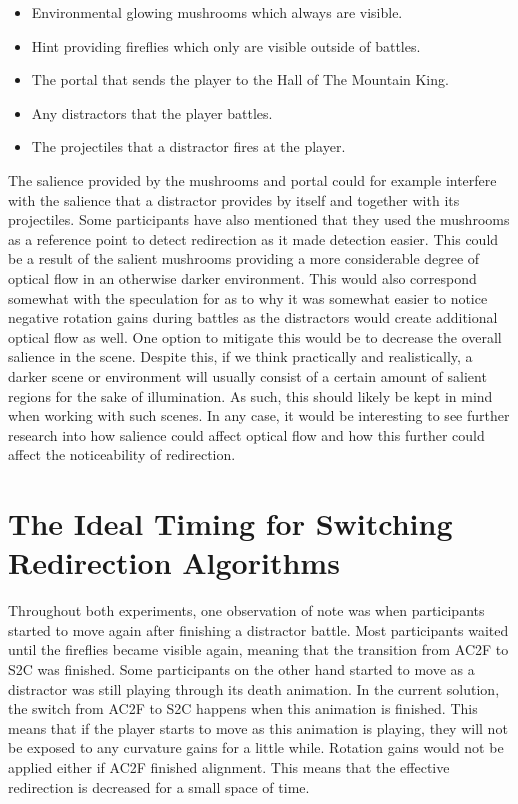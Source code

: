 \begin{itemize}
    \item Environmental glowing mushrooms which always are visible.
    \item Hint providing fireflies which only are visible outside of battles.
    \item The portal that sends the player to the Hall of The Mountain King. 
    \item Any distractors that the player battles.
    \item The projectiles that a distractor fires at the player. 
\end{itemize}

The salience provided by the mushrooms and portal could for example interfere with the salience that a distractor provides by itself and together with its projectiles. Some participants have also mentioned that they used the mushrooms as a reference point to detect redirection as it made detection easier. This could be a result of the salient mushrooms providing a more considerable degree of optical flow in an otherwise darker environment. This would also correspond somewhat with the speculation for as to why it was somewhat easier to notice negative rotation gains during battles as the distractors would create additional optical flow as well. One option to mitigate this would be to decrease the overall salience in the scene. Despite this, if we think practically and realistically, a darker scene or environment will usually consist of a certain amount of salient regions for the sake of illumination. As such, this should likely be kept in mind when working with such scenes. In any case, it would be interesting to see further research into how salience could affect optical flow and how this further could affect the noticeability of redirection.

\section{The Ideal Timing for Switching Redirection Algorithms}\label{sec:idealAlgorithmTimingSwitch}
Throughout both experiments, one observation of note was when participants started to move again after finishing a distractor battle. Most participants waited until the fireflies became visible again, meaning that the transition from AC2F to S2C was finished. Some participants on the other hand started to move as a distractor was still playing through its death animation. In the current solution, the switch from AC2F to S2C happens when this animation is finished. This means that if the player starts to move as this animation is playing, they will not be exposed to any curvature gains for a little while. Rotation gains would not be applied either if AC2F finished alignment. This means that the effective redirection is decreased for a small space of time. 

